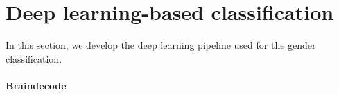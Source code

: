\section{Deep learning-based classification}

In this section, we develop the deep learning pipeline used for the gender classification. 

\paragraph{Braindecode} \cite{braindecode}